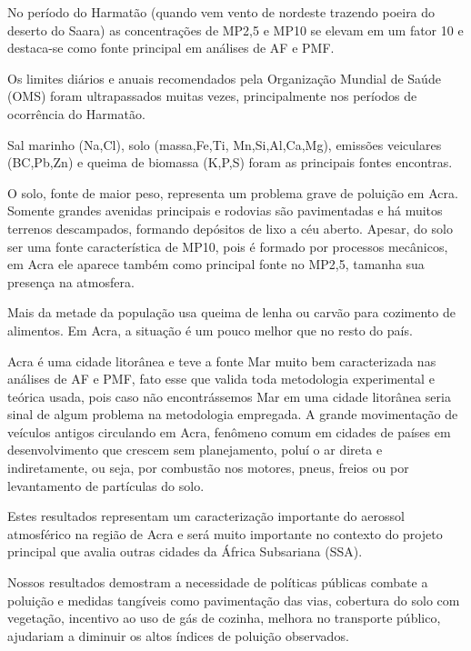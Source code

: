 No período do Harmatão (quando vem vento de nordeste trazendo poeira do deserto do Saara) as concentrações de MP2,5 e MP10 se elevam em um fator 10 e destaca-se como fonte principal em análises de AF e PMF. 

Os limites diários e anuais recomendados pela Organização Mundial de Saúde (OMS) foram ultrapassados muitas vezes, principalmente nos períodos de ocorrência do Harmatão.

Sal marinho (Na,Cl), solo (massa,Fe,Ti, Mn,Si,Al,Ca,Mg), emissões veiculares (BC,Pb,Zn) e queima de biomassa (K,P,S) foram as principais fontes encontras.  

O solo, fonte de maior peso, representa um problema grave de poluição em Acra. Somente grandes avenidas principais e rodovias são pavimentadas e há muitos terrenos descampados, formando depósitos de lixo a céu aberto. Apesar, do solo ser uma fonte característica de MP10, pois é formado por processos mecânicos, em Acra ele aparece também como principal fonte no MP2,5, tamanha sua presença na atmosfera.    

Mais da metade da população usa queima de lenha ou carvão para cozimento de alimentos. Em Acra, a situação é um pouco melhor que no resto do país. 

Acra é uma cidade litorânea e teve a fonte Mar muito bem caracterizada nas análises de AF e PMF, fato esse que valida toda metodologia experimental e teórica usada, pois caso não encontrássemos Mar em uma cidade litorânea seria sinal de algum problema na metodologia empregada. 
A grande movimentação de veículos antigos circulando em Acra, fenômeno comum em cidades de países em desenvolvimento que crescem sem planejamento, poluí o ar direta e indiretamente, ou seja, por combustão nos motores, pneus, freios ou por levantamento de partículas do solo. 

Estes resultados representam um caracterização importante do aerossol atmosférico na região de Acra e será muito importante no contexto do projeto principal que avalia outras cidades da África Subsariana (SSA). 

Nossos resultados demostram a necessidade de políticas públicas combate a poluição e medidas tangíveis como pavimentação das vias, cobertura do solo com vegetação, incentivo ao uso de gás de cozinha, melhora no transporte público, ajudariam a diminuir os altos índices de poluição observados.
